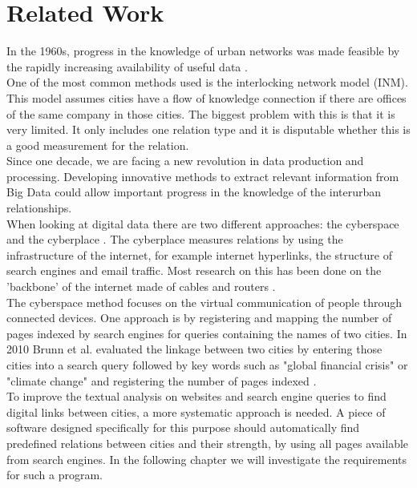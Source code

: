 \section{Related Work}
In the 1960s, progress in the knowledge of urban networks was made feasible by the rapidly increasing availability of useful data \cite{tornqvist1968flows}. \\
One of the most common methods used is the interlocking network model (INM)\cite{taylor2012interlocking}. This model assumes cities have a flow of knowledge connection if there are offices of the same company in those cities. The biggest problem with this is that it is very limited. It only includes one relation type and it is disputable whether this is a good measurement for the relation. \\

Since one decade, we are facing a new revolution in data production and processing. Developing innovative methods to extract relevant information from Big Data could allow important progress in the knowledge of the interurban relationships. \\

When looking at digital data there are two different approaches: the cyberspace and the cyberplace \cite{devriendt2008cyberplace}. The cyberplace measures relations by using the infrastructure of the internet, for example internet hyperlinks, the structure of search engines and email traffic. Most research on this has been done on the 'backbone' of the internet made of cables and routers \cite{choi2006comparing, gorman2000networks}. \\

The cyberspace method focuses on the virtual communication of people through connected devices. One approach is by registering and mapping the number of pages indexed by search engines for queries containing the names of two cities\cite{devriendt2008cyberplace, janc2015visibility, janc2015geography}. In 2010 Brunn et al. evaluated the linkage between two cities by entering those cities into a search query followed by key words such as "global financial crisis" or "climate change" and registering the number of pages indexed \cite{brunn2010networks}. \\

To improve the textual analysis on websites and search engine queries to find digital links between cities, a more systematic approach is needed.  A piece of software designed specifically for this purpose should automatically find predefined relations between cities and their strength, by using all pages available from search engines. In the following chapter we will investigate the requirements for such a program.

